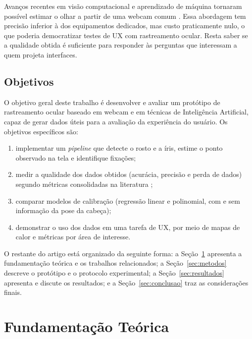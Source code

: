 \documentclass[sigconf, nonacm, language=english, language=portuguese, natbib=false]{acmart}
\begin{document}
Avanços recentes em visão computacional e aprendizado de máquina tornaram possível estimar o olhar a partir de uma webcam comum \cite{papoutsaki2016webgazer, krafka2016eye, Park2018ETRA}. Essa abordagem tem precisão inferior à dos equipamentos dedicados, mas custo praticamente nulo, o que poderia democratizar testes de UX com rastreamento ocular. Resta saber se a qualidade obtida é suficiente para responder às perguntas que interessam a quem projeta interfaces.

\subsection{Objetivos}

O objetivo geral deste trabalho é desenvolver e avaliar um protótipo de rastreamento ocular baseado em webcam e em técnicas de Inteligência Artificial, capaz de gerar dados úteis para a avaliação da experiência do usuário. Os objetivos específicos são:
\begin{enumerate}
  \item implementar um \emph{pipeline} que detecte o rosto e a íris, estime o ponto observado na tela e identifique fixações;
  \item medir a qualidade dos dados obtidos (acurácia, precisão e perda de dados) segundo métricas consolidadas na literatura \cite{holmqvist2012quality};
  \item comparar modelos de calibração (regressão linear e polinomial, com e sem informação da pose da cabeça);
  \item demonstrar o uso dos dados em uma tarefa de UX, por meio de mapas de calor e métricas por área de interesse.
\end{enumerate}

O restante do artigo está organizado da seguinte forma: a Seção~\ref{sec:fundamentacao} apresenta a fundamentação teórica e os trabalhos relacionados; a Seção~\ref{sec:metodos} descreve o protótipo e o protocolo experimental; a Seção~\ref{sec:resultados} apresenta e discute os resultados; e a Seção~\ref{sec:conclusao} traz as considerações finais.

\section{Fundamentação Teórica}\label{sec:fundamentacao}
\end{document}
